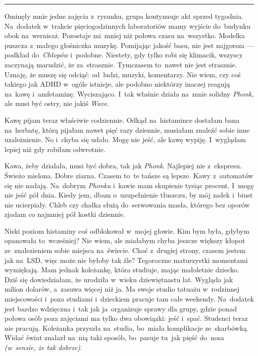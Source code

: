 \documentclass[9pt, a5paper]{memoir}
\begin{document}
\fancybreak{* \quad * \quad *}

Ominęły mnie jedne zajęcia z~rysunku, grupa kontynuuje akt sprzed tygodnia. Na~dodatek w~trakcie pięciogodzinnych laboratoriów mamy wyjście do~budynku obok na~wernisaż. Pozostaje mi~mniej niż połowa czasu na~wszystko. Modelka puszcza z~małego głośniczka muzykę. Pomijając jakość basu, nie jest najgorsza --- podkład do~\textit{Chłopów} i~podobne. Niestety, gdy tylko robi się klimacik, wszyscy zaczynają marudzić, że za~strasznie. Tymczasem to~nawet nie jest strasznie. Uznaję, że muszę się odciąć: od~ludzi, muzyki, komentarzy. Nie wiem, czy coś takiego jak ADHD w~ogóle istnieje, ale podobno niektórzy inaczej reagują na~kawę i~amfetaminę. Wyciszająco. I~tak właśnie działa na~mnie solidny \textit{Phonk}, ale musi być ostry, nie jakiś \textit{Wave}.

Kawę pijam teraz właściwie codziennie. Odkąd na~histamince dostałam bana na~herbatę, którą pijałam nawet pięć razy dziennie, musiałam znaleźć sobie inne uzależnienie. No i~chyba się udało. Mogę nie jeść, ale kawę wypiję. I~wyglądam lepiej niż gdy robiłam odwrotnie.

Kawa, żeby działała, musi być dobra, tak jak \textit{Phonk}. Najlepiej nie z~ekspresu. Świeżo mielona. Dobre ziarna. Czasem to~te tańsze są lepsze. Kawy z~automatów się nie nadają. Na~dobrym \textit{Phonku} i~kawie mam skupienie tysiąc procent. I~mogę nie jeść pół dnia. Kiedy jem, dbam o~uzupełnienie tłuszczu, by mój zadek i~biust nie ucierpiały. Chleb czy chałka służą do~serwowania masła, którego bez oporów zjadam co najmniej pół kostki dziennie.

Niski poziom histaminy coś odblokował w~mojej głowie. Kim bym była, gdybym opanowała to~wcześniej? Nie wiem, ale miałabym chyba jeszcze większy kłopot ze~znalezieniem sobie miejsca na~świecie. Choć z~drugiej strony, czasem jestem jak na~LSD, więc może nie byłoby tak źle? Tegoroczne maturzystki momentami wymiękają. Mam jednak koleżankę, która studiuje, mając małoletnie dziecko. Dziś się dowiedziałam, że urodziła w~wieku dziewiętnastu lat. Wygląda jak milion dolarów, a~zasuwa więcej niż ja. Ma swoje studio tatuażu w~rodzinnej miejscowości i~poza studiami i~dzieckiem pracuje tam całe weekendy. Na~dodatek jest bardzo wdzięczna i~tak jak ja~organizuje sprawy dla grupy, gdzie ponad połowa osób poza zajęciami ma tylko dwa obowiązki: jeść i~spać. Studenci teraz nie pracują. Koleżanka przyszła na~studia, bo~miała komplikacje ze~skarbówką. Widać świat znalazł na~nią taki sposób, bo~pasuje tu~jak pięść do~nosa \textit{(w~sensie, że tak dobrze)}.
\end{document}
